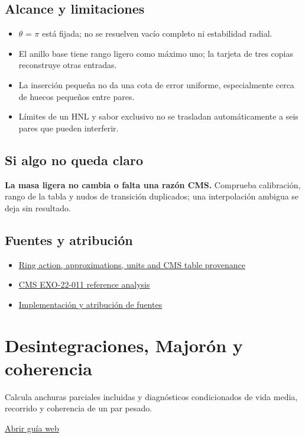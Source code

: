 \documentclass[11pt,a4paper]{article}
\begin{document}
\subsection*{Alcance y limitaciones}
\begin{itemize}
\item \ensuremath{\theta} = \ensuremath{\pi} está fijada; no se resuelven vacío completo ni estabilidad radial.
\item El anillo base tiene rango ligero como máximo uno; la tarjeta de tres copias reconstruye otras entradas.
\item La inserción pequeña no da una cota de error uniforme, especialmente cerca de huecos pequeños entre pares.
\item Límites de un HNL y sabor exclusivo no se trasladan automáticamente a seis pares que pueden interferir.
\end{itemize}
\subsection*{Si algo no queda claro}
\textbf{La masa ligera no cambia o falta una razón CMS.} Comprueba calibración, rango de la tabla y nudos de transición duplicados; una interpolación ambigua se deja sin resultado.

\subsection*{Fuentes y atribución}
\begin{itemize}
\item \href{https://github.com/karlesmarin/ghu-lab/blob/main/docs/neutrino-ring.md}{Ring action, approximations, units and CMS table provenance}
\item \href{https://cms-results.web.cern.ch/cms-results/public-results/publications/EXO-22-011/}{CMS EXO-22-011 reference analysis}
\item \href{https://github.com/karlesmarin/ghu-lab/blob/main/src/modules/neutrino_ring.mjs}{Implementación y atribución de fuentes}
\end{itemize}
\section{Desintegraciones, Majorón y coherencia}
Calcula anchuras parciales incluidas y diagnósticos condicionados de vida media, recorrido y coherencia de un par pesado.

\href{https://karlesmarin.github.io/ghu-explorer/guide/es/neutrino-decays/index.html}{Abrir guía web}
\end{document}
